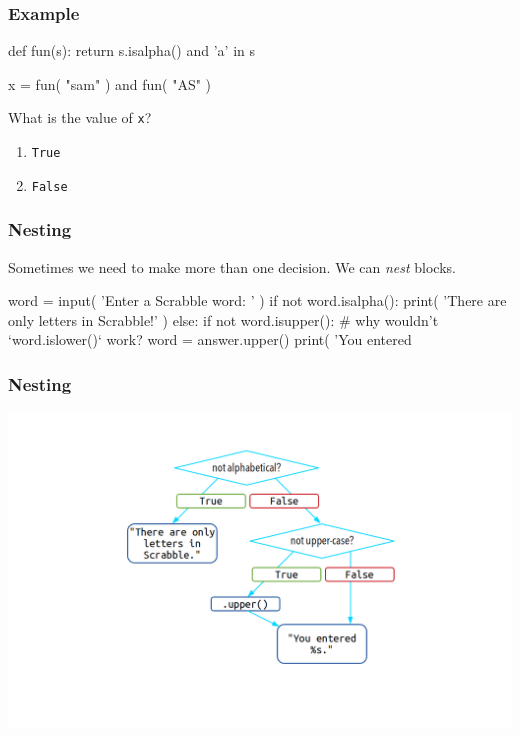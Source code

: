 \documentclass[11pt]{beamer}
\begin{document}
\begin{frame}[fragile]
  \frametitle{Example}
  \Enlarge

  \begin{semiverbatim}
def fun(s):
    return s.isalpha() and 'a' in s

x = fun( "sam" ) and fun( "AS" )
  \end{semiverbatim}
  What is the value of \texttt{x}?
  \begin{enumerate}[label=\Alph*]
  \item  \texttt{True}
  \item  \texttt{False}
  \end{enumerate}
\end{frame}

\begin{frame}[fragile]
  \frametitle{Nesting}
  \Enlarge

  \begin{itemize}
  \myitem  Sometimes we need to make more than one decision.
  \myitem  We can \emph{nest} blocks.
    \begin{semiverbatim}
word = input( 'Enter a Scrabble word:  ' )
if not word.isalpha():
    print( 'There are only letters in Scrabble!' )
else:
    if not word.isupper():      # why wouldn't `word.islower()` work?
        word = answer.upper()
    print( 'You entered %
    \end{semiverbatim}
  \end{itemize}
\end{frame}

\begin{frame}
  \frametitle{Nesting}
  \includegraphics[width=\textwidth]{./img/control-flow-nesting-else.png}
\end{frame}
\end{document}
